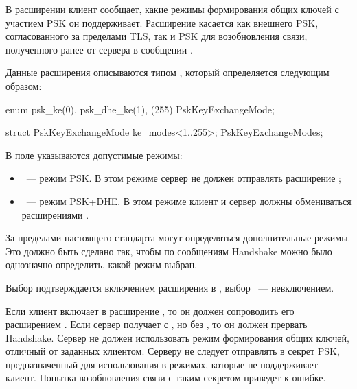 В расширении  клиент сообщает, какие режимы 
формирования общих ключей с участием PSK он поддерживает.
%
Расширение касается как внешнего PSK, согласованного за пределами TLS, 
так и PSK для возобновления связи, полученного ранее от сервера в сообщении  
.

Данные расширения  описываются типом 
, который определяется следующим образом: 

\begin{codeblock}
enum { psk_ke(0), psk_dhe_ke(1), (255) } PskKeyExchangeMode;

struct {
    PskKeyExchangeMode ke_modes<1..255>;
} PskKeyExchangeModes;
\end{codeblock}

В поле  указываются допустимые режимы:
\begin{itemize}
\item
{}~--- режим PSK. В этом режиме сервер не должен отправлять 
расширение ; 
\item
{}~--- режим PSK+DHE. В этом режиме клиент и сервер должны 
обмениваться расширениями .
\end{itemize}

За пределами настоящего стандарта могут определяться дополнительные режимы.
Это должно быть сделано так, чтобы по сообщениям Handshake можно было 
однозначно определить, какой режим выбран. 

\begin{note*}
Выбор  подтверждается включением расширения 
 в , выбор 
~--- невключением.
\end{note*}

Если клиент включает в  расширение 
, то он должен сопроводить его 
расширением .
%
Если сервер получает  с 
, но без , 
то он должен прервать Handshake. 
%
Сервер не должен использовать режим формирования общих ключей,
отличный от заданных клиентом. 
%
Серверу не следует отправлять в 
секрет PSK, предназначенный для использования в режимах, которые не 
поддерживает клиент. Попытка возобновления связи с таким секретом
приведет к ошибке.


